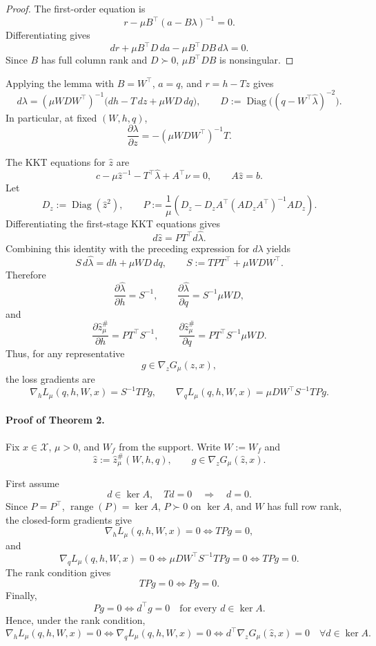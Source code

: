 \documentclass{article}
\newcommand{\1}{\mathbf{1}}
\theoremstyle{plain}
\theoremstyle{definition}
\theoremstyle{remark}
\begin{document}
\begin{proof}
The first-order equation is
\[
        r-\mu B^\top(a-B\lambda)^{-1}=0.
\]
Differentiating gives
\[
        dr+\mu B^\top D\,da-\mu B^\top D B\,d\lambda=0.
\]
Since $B$ has full column rank and $D\succ0$, $\mu B^\top D B$ is nonsingular.
\end{proof}

Applying the lemma with $B=W^\top$, $a=q$, and $r=h-Tz$ gives
\[
        d\lambda
        =
        (\mu WDW^\top)^{-1}
        \bigl(dh-T\,dz+\mu WD\,dq\bigr),
        \qquad
        D:=\operatorname{Diag}\bigl((q-W^\top\hat\lambda)^{-2}\bigr).
\]
In particular, at fixed $(W,h,q)$,
\[
        \frac{\partial\lambda}{\partial z}
        =
        -(\mu WDW^\top)^{-1}T.
\]

The KKT equations for $\hat z$ are
\[
        c-\mu \hat z^{-1}-T^\top\hat\lambda+A^\top\nu=0,
        \qquad
        A\hat z=b.
\]
Let
\[
        D_z:=\operatorname{Diag}(\hat z^2),
        \qquad
        P
        :=
        \frac1\mu
        \left(
        D_z
        -
        D_zA^\top(AD_zA^\top)^{-1}AD_z
        \right).
\]
Differentiating the first-stage KKT equations gives
\[
        d\hat z=P T^\top d\hat\lambda.
\]
Combining this identity with the preceding expression for $d\lambda$ yields
\[
        S\,d\hat\lambda=dh+\mu WD\,dq,
        \qquad
        S:=TPT^\top+\mu WDW^\top.
\]
Therefore
\[
        \frac{\partial\hat\lambda}{\partial h}=S^{-1},
        \qquad
        \frac{\partial\hat\lambda}{\partial q}=S^{-1}\mu WD,
\]
and
\[
        \boxed{
        \frac{\partial \hat z_\mu^\#}{\partial h}
        =
        PT^\top S^{-1}}
        ,
        \qquad
        \boxed{
        \frac{\partial \hat z_\mu^\#}{\partial q}
        =
        PT^\top S^{-1}\mu WD}.
\]
Thus, for any representative
\[
        g\in\nabla_zG_\mu(\hat z,x),
\]
the loss gradients are
\[
        \boxed{
        \nabla_h L_\mu(q,h,W,x)
        =
        S^{-1}TPg},
        \qquad
        \boxed{
        \nabla_q L_\mu(q,h,W,x)
        =
        \mu DW^\top S^{-1}TPg}.
\]

\paragraph{Proof of Theorem 2.}
Fix $x\in \mathcal X$, $\mu>0$, and $W_f$ from the support. Write $W:=W_f$ and
\[
        \hat z:=\hat z_\mu^\#(W,h,q),
        \qquad
        g\in\nabla_zG_\mu(\hat z,x).
\]

First assume
\[
        d\in\ker A,
        \quad
        Td=0
        \quad\Longrightarrow\quad
        d=0.
\]
Since $P=P^\top$, $\operatorname{range}(P)=\ker A$, $P\succ0$ on $\ker A$, and $W$ has full row rank, the closed-form gradients give
\[
        \nabla_h L_\mu(q,h,W,x)=0
        \iff
        TPg=0,
\]
and
\[
        \nabla_q L_\mu(q,h,W,x)=0
        \iff
        \mu DW^\top S^{-1}TPg=0
        \iff
        TPg=0.
\]
The rank condition gives
\[
        TPg=0
        \iff
        Pg=0.
\]
Finally,
\[
        Pg=0
        \iff
        d^\top g=0
        \quad\text{for every }d\in\ker A.
\]
Hence, under the rank condition,
\[
        \nabla_h L_\mu(q,h,W,x)=0
        \iff
        \nabla_q L_\mu(q,h,W,x)=0
        \iff
        d^\top\nabla_zG_\mu(\hat z,x)=0
        \quad\forall d\in\ker A.
\]
\end{document}
